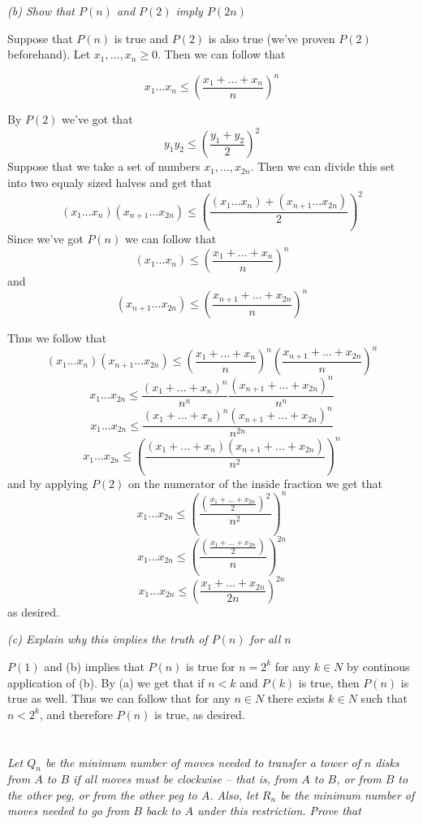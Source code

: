 \documentclass[11pt,oneside,titlepage]{book}
\begin{document}
\textit{(b) Show that $P(n)$ and $P(2)$ imply $P(2n)$}

Suppose that $P(n)$ is true and $P(2)$ is also true (we've proven $P(2)$ beforehand).
Let $x_1, ..., x_n \geq 0$. Then we can follow that

$$x_1 ... x_n \leq \left(\frac{x_1 + ... + x_n}{n}\right)^n$$

By $P(2)$ we've got that
$$y_1 y_2 \leq \left(\frac{y_1 + y_2}{2}\right)^2$$
Suppose that we take a set of numbers $x_1, ..., x_{2n}$. Then we can divide this set into
two equaly sized halves and get that
$$(x_1 ... x_n) (x_{n + 1} ... x_{2n}) \leq
\left(\frac{(x_1 ... x_n) + (x_{n + 1} ... x_{2n})}{2}\right)^2$$
Since we've got $P(n)$ we can follow that
$$(x_1 ... x_n) \leq \left(\frac{x_1 + ... + x_n}{n}\right)^n$$
and
$$(x_{n + 1} ... x_{2n}) \leq \left(\frac{x_{n + 1} + ... + x_{2n}}{n}\right)^n$$

Thus we follow that
$$ (x_1 ... x_n)(x_{n + 1} ... x_{2n}) \leq \left(\frac{x_1 + ... + x_n}{n}\right)^n
\left(\frac{x_{n + 1} + ... + x_{2n}}{n}\right)^n$$
$$ x_1 ... x_{2n} \leq \frac{(x_1 + ... + x_n)^n}{n^n}
\frac{(x_{n + 1} + ... + x_{2n})^n}{n^n}$$
$$ x_1 ... x_{2n} \leq \frac{(x_1 + ... + x_n)^n(x_{n + 1} + ... + x_{2n})^n}{n^{2n}}$$
$$ x_1 ... x_{2n} \leq \left(\frac{(x_1 + ... + x_n)(x_{n + 1} + ... + x_{2n})}{n^{2}}\right)^n$$
and by applying $P(2)$ on the numerator of the inside fraction we get that 
$$ x_1 ... x_{2n} \leq \left(\frac{\left(\frac{x_1 + ... + x_{2n}}{2}\right)^2}{n^{2}}\right)^n$$
$$ x_1 ... x_{2n} \leq \left(\frac{\left(\frac{x_1 + ... + x_{2n}}{2}\right)}{n}\right)^{2n}$$
$$ x_1 ... x_{2n} \leq \left(\frac{x_1 + ... + x_{2n}}{2n}\right)^{2n}$$
as desired.

\textit{(c) Explain why this implies the truth of $P(n)$ for all $n$}

$P(1)$ and (b) implies that $P(n)$ is true for $n = 2^k$ for any $k \in N$ by continous application
of (b). By (a) we get that
if $n < k$ and $P(k)$ is true,
then $P(n)$ is true as well. Thus we can follow that for any $n \in N$
there exists $k \in N$ such that $n < 2^k$, and therefore $P(n)$ is true, as desired.

\section{}

\textit{Let $Q_n$ be the minimum number of moves needed to transfer a tower of $n$ disks
  from $A$ to $B$ if all moves must be clockwise -- that is, from $A$ to $B$, or from $B$ to
  the other peg, or from the other peg to $A$. Also, let $R_n$ be the minimum number of moves
  needed to go from $B$ back to $A$ under this restriction. Prove that }
\end{document}
